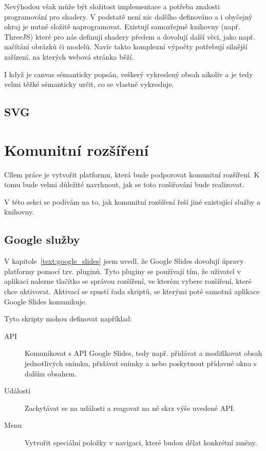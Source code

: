 Nevýhodou však může být složitost implementace a potřeba znalosti programování pro shadery.
V podstatě není nic dalšího definováno a i obyčejný okraj je nutné složitě naprogramovat.
Existují samozřejmě knihovny (např. ThreeJS) které pro nás definují shadery předem a dovolují další věci, jako např. načítání obrázků či modelů.
Navíc takto komplexní výpočty potřebují silnější zařízení, na kterých webová stránka běží.

I když je canvas sémanticky popsán, veškerý vykreslený obsah nikoliv a je tedy velmi těžké sémanticky určit, co se vlastně vykresluje.

\subsection{SVG}


\section{Komunitní rozšíření}\label{text:community_plugins}

Cílem práce je vytvořit platformu, která bude podporovat komunitní rozšíření.
K tomu bude velmi důležité navrhnout, jak se toto rozšiřování bude realizovat.

V této sekci se podívám na to, jak komunitní rozšíření řeší jiné existující služby a knihovny.

\subsection{Google služby}

V kapitole~\ref{text:google_slides} jsem uvedl, že Google Slides dovolují úpravy platformy pomocí tzv. pluginů.
Tyto pluginy se používají tím, že uživatel v aplikaci nalezne tlačítko se správou rozšíření, ve kterém vybere rozšíření, které chce aktivovat.
Aktivací se spustí řada skriptů, se kterými poté samotná aplikace Google Slides komunikuje.

Tyto skripty mohou definovat například:

\begin{description}
    \item[API] Komunikovat s API Google Slides, tedy např. přidávat a modifikovat obsah jednotlivých snímku, přidávat snímky a nebo poskytnout přídavné okna s dalším obsahem.
    \item[Události] Zachytávat se na události a reagovat na ně skrz výše uvedené API.
    \item[Menu] Vytvořit speciální položky v navigaci, které budou dělat konkrétní změny.
\end{description}

